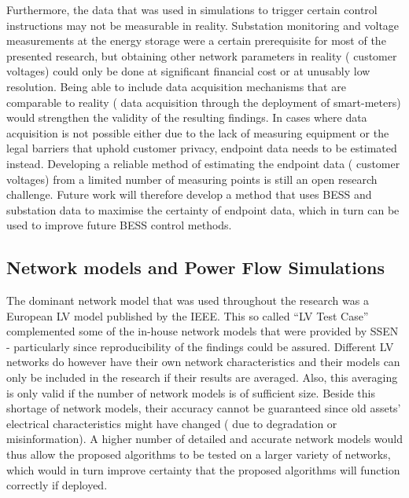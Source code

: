 Furthermore, the data that was used in simulations to trigger certain control instructions may not be measurable in reality.
Substation monitoring and voltage measurements at the energy storage were a certain prerequisite for most of the presented research, but obtaining other network parameters in reality ( customer voltages) could only be done at significant financial cost or at unusably low resolution.
Being able to include data acquisition mechanisms that are comparable to reality ( data acquisition through the deployment of smart-meters) would strengthen the validity of the resulting findings.
In cases where data acquisition is not possible either due to the lack of measuring equipment or the legal barriers that uphold customer privacy, endpoint data needs to be estimated instead.
Developing a reliable method of estimating the endpoint data ( customer voltages) from a limited number of measuring points is still an open research challenge.
Future work will therefore develop a method that uses BESS and substation data to maximise the certainty of endpoint data, which in turn can be used to improve future BESS control methods.

\subsection{Network models and Power Flow Simulations}

The dominant network model that was used throughout the research was a European LV model published by the IEEE.
This so called ``LV Test Case'' complemented some of the in-house network models that were provided by SSEN - particularly since reproducibility of the findings could be assured.
Different LV networks do however have their own network characteristics and their models can only be included in the research if their results are averaged.
Also, this averaging is only valid if the number of network models is of sufficient size.
Beside this shortage of network models, their accuracy cannot be guaranteed since old assets' electrical characteristics might have changed ( due to degradation or misinformation).
A higher number of detailed and accurate network models would thus allow the proposed algorithms to be tested on a larger variety of networks, which would in turn improve certainty that the proposed algorithms will function correctly if deployed.

